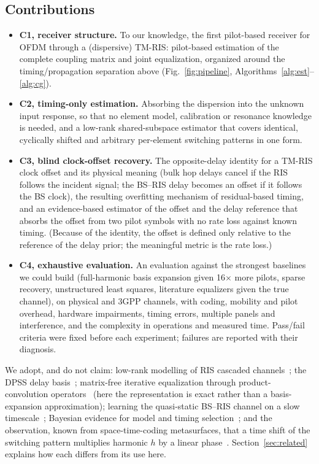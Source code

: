 \subsection{Contributions}
\begin{itemize}
\item \textbf{C1, receiver structure.} To our knowledge, the first pilot-based receiver for OFDM through a
(dispersive) TM-RIS: pilot-based estimation of the complete coupling matrix and joint
equalization, organized around the timing/propagation separation above
(Fig.~\ref{fig:pipeline}, Algorithms~\ref{alg:est}--\ref{alg:cg}).
\item \textbf{C2, timing-only estimation.} Absorbing the dispersion into the unknown
input response, so that no element model, calibration or resonance knowledge is needed,
and a low-rank shared-subspace estimator that covers identical, cyclically shifted and
arbitrary per-element switching patterns in one form.
\item \textbf{C3, blind clock-offset recovery.} The opposite-delay identity for a
TM-RIS clock offset and its physical meaning (bulk hop delays cancel if the RIS follows the incident signal;
the BS--RIS delay becomes an offset if it follows the BS clock), the resulting overfitting mechanism of
residual-based timing, and an evidence-based estimator of the offset and the delay reference that absorbs the offset from two pilot symbols
with no rate loss against known timing. (Because of the identity, the offset is defined only
relative to the reference of the delay prior; the meaningful metric is the rate loss.)
\item \textbf{C4, exhaustive evaluation.} An evaluation against the strongest
baselines we could build (full-harmonic basis expansion given 16$\times$ more pilots,
sparse recovery, unstructured least squares, literature equalizers given the true
channel), on physical and 3GPP channels, with coding, mobility and pilot overhead,
hardware impairments, timing errors, multiple panels and interference, and the
complexity in operations and measured time. Pass/fail criteria were fixed before each
experiment; failures are reported with their diagnosis.
\end{itemize}

We adopt, and do not claim: low-rank modelling of RIS cascaded
channels~\cite{wang2020compressed}; the DPSS delay basis~\cite{slepian1978,zemen2005};
matrix-free iterative equalization through product-convolution
operators~\cite{hrycak2010} (here the representation is exact rather than a
basis-expansion approximation); learning the quasi-static BS--RIS channel on a slow
timescale~\cite{hu2019twotimescale}; Bayesian evidence for model and timing
selection~\cite{mackay1992,access2019bayes}; and the observation, known from
space-time-coding metasurfaces, that a time shift of the switching pattern multiplies
harmonic $h$ by a linear phase~\cite{zhang2018}. Section~\ref{sec:related} explains
how each differs from its use here.

